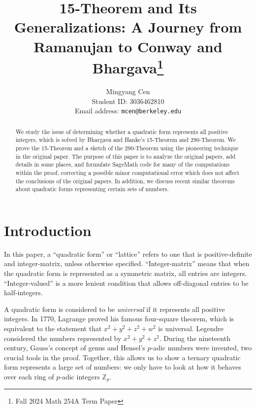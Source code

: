 \documentclass[letterpaper, 12pt]{article}
\title{15-Theorem and Its Generalizations: A Journey from Ramanujan to Conway and Bhargava\footnote{Fall 2024 Math 254A Term Paper}}
\author{Mingyang Cen \\ Student ID: 3036462810 \\ Email address: \texttt{mcen@berkeley.edu}}
\begin{document}
\maketitle

\begin{abstract}
    We study the issue of determining whether a quadratic form represents all positive integers, which is solved by Bhargava and Hanke's 15-Theorem and 290-Theorem. We prove the 15-Theorem and a sketch of the 290-Theorem using the pioneering technique in the original paper. The purpose of this paper is to analyze the original papers, add details in some places, and formulate SageMath code for many of the computations within the proof, correcting a possible minor computational error which does not affect the conclusions of the original papers. In addition, we discuss recent similar theorems about quadratic forms representing certain sets of numbers.
\end{abstract}

\tableofcontents

\section{Introduction}
In this paper, a ``quadratic form'' or ``lattice'' refers to one that is positive-definite and integer-matrix, unless otherwise specified. ``Integer-matrix'' means that when the quadratic form is represented as a symmetric matrix, all entries are integers. ``Integer-valued'' is a more lenient condition that allows off-diagonal entries to be half-integers.

A quadratic form is considered to be \emph{universal} if it represents all positive integers.
%
In 1770, Lagrange \cite{LagrangeFourSquareTheorem} proved his famous four-square theorem, which is equivalent to the statement that $x^2 + y^2 + z^2 + w^2$ is universal. Legendre considered the numbers represented by $x^2 + y^2 + z^2$. During the nineteenth century, Gauss's concept of genus and Hensel's $p$-adic numbers were invented, two crucial tools in the proof. Together, this allows us to show a ternary quadratic form represents a large set of numbers: we only have to look at how it behaves over each ring of $p$-adic integers $\mathbb{Z}_p$.
\end{document}
